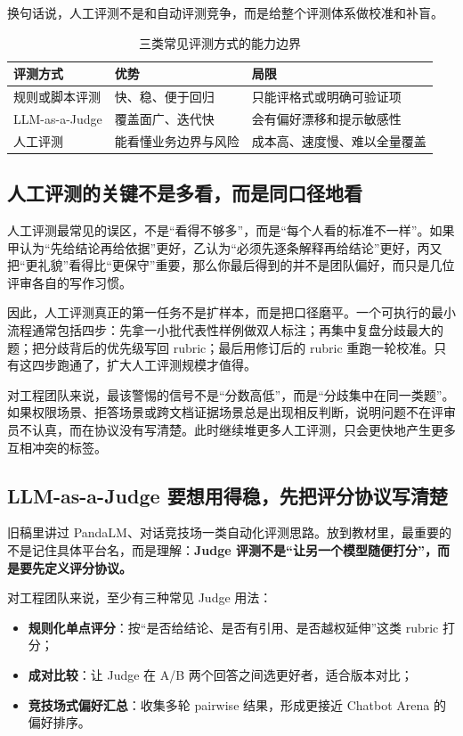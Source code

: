 换句话说，人工评测不是和自动评测竞争，而是给整个评测体系做校准和补盲。

\begin{table}[H]
\centering
\small
\begin{tabularx}{\textwidth}{>{\raggedright\arraybackslash}p{2.9cm}>{\raggedright\arraybackslash}p{3cm}>{\raggedright\arraybackslash}X}
\toprule
\textbf{评测方式} & \textbf{优势} & \textbf{局限} \\
\midrule
规则或脚本评测 & 快、稳、便于回归 & 只能评格式或明确可验证项 \\
LLM-as-a-Judge & 覆盖面广、迭代快 & 会有偏好漂移和提示敏感性 \\
人工评测 & 能看懂业务边界与风险 & 成本高、速度慢、难以全量覆盖 \\
\bottomrule
\end{tabularx}
\caption{三类常见评测方式的能力边界}
\label{tab:eval-methods}
\end{table}

\subsection{人工评测的关键不是多看，而是同口径地看}
人工评测最常见的误区，不是“看得不够多”，而是“每个人看的标准不一样”。如果甲认为“先给结论再给依据”更好，乙认为“必须先逐条解释再给结论”更好，丙又把“更礼貌”看得比“更保守”重要，那么你最后得到的并不是团队偏好，而只是几位评审各自的写作习惯。

因此，人工评测真正的第一任务不是扩样本，而是把口径磨平。一个可执行的最小流程通常包括四步：先拿一小批代表性样例做双人标注；再集中复盘分歧最大的题；把分歧背后的优先级写回 rubric；最后用修订后的 rubric 重跑一轮校准。只有这四步跑通了，扩大人工评测规模才值得。

对工程团队来说，最该警惕的信号不是“分数高低”，而是“分歧集中在同一类题”。如果权限场景、拒答场景或跨文档证据场景总是出现相反判断，说明问题不在评审员不认真，而在协议没有写清楚。此时继续堆更多人工评测，只会更快地产生更多互相冲突的标签。

\subsection{LLM-as-a-Judge 要想用得稳，先把评分协议写清楚}
旧稿里讲过 PandaLM、对话竞技场一类自动化评测思路。放到教材里，最重要的不是记住具体平台名，而是理解：\textbf{Judge 评测不是“让另一个模型随便打分”，而是要先定义评分协议。}

对工程团队来说，至少有三种常见 Judge 用法：
\begin{itemize}
  \item \textbf{规则化单点评分}：按“是否给结论、是否有引用、是否越权延伸”这类 rubric 打分；
  \item \textbf{成对比较}：让 Judge 在 A/B 两个回答之间选更好者，适合版本对比；
  \item \textbf{竞技场式偏好汇总}：收集多轮 pairwise 结果，形成更接近 Chatbot Arena 的偏好排序。
\end{itemize}

